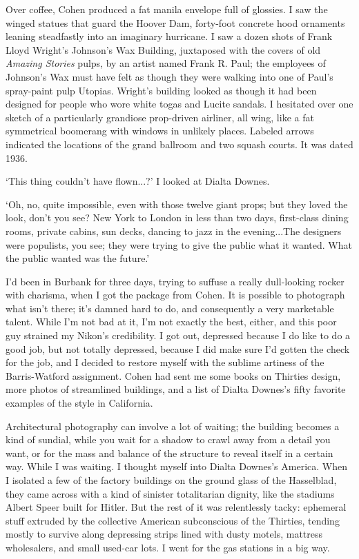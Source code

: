 Over coffee, Cohen produced a fat manila envelope full of glossies. I saw the winged statues that guard the Hoover Dam, forty-foot concrete hood ornaments leaning steadfastly into an imaginary hurricane. I saw a dozen shots of Frank Lloyd Wright's Johnson's Wax Building, juxtaposed with the covers of old \textit{Amazing Stories} pulps, by an artist named Frank R. Paul; the employees of Johnson's Wax must have felt as though they were walking into one of Paul's spray-paint pulp Utopias. Wright's building looked as though it had been designed for people who wore white togas and Lucite sandals. I hesitated over one sketch of a particularly grandiose prop-driven airliner, all wing, like a fat symmetrical boomerang with windows in unlikely places. Labeled arrows indicated the locations of the grand ballroom and two squash courts. It was dated 1936.

`This thing couldn't have flown...?' I looked at Dialta Downes.

`Oh, no, quite impossible, even with those twelve giant props; but they loved the look, don't you see? New York to London in less than two days, first-class dining rooms, private cabins, sun decks, dancing to jazz in the evening...The designers were populists, you see; they were trying to give the public what it wanted. What the public wanted was the future.'

I'd been in Burbank for three days, trying to suffuse a really dull-looking rocker with charisma, when I got the package from Cohen. It is possible to photograph what isn't there; it's damned hard to do, and consequently a very marketable talent. While I'm not bad at it, I'm not exactly the best, either, and this poor guy strained my Nikon's credibility. I got out, depressed because I do like to do a good job, but not totally depressed, because I did make sure I'd gotten the check for the job, and I decided to restore myself with the sublime artiness of the Barris-Watford assignment. Cohen had sent me some books on Thirties design, more photos of streamlined buildings, and a list of Dialta Downes's fifty favorite examples of the style in California.

Architectural photography can involve a lot of waiting; the building becomes a kind of sundial, while you wait for a shadow to crawl away from a detail you want, or for the mass and balance of the structure to reveal itself in a certain way. While I was waiting. I thought myself into Dialta Downes's America. When I isolated a few of the factory buildings on the ground glass of the Hasselblad, they came across with a kind of sinister totalitarian dignity, like the stadiums Albert Speer built for Hitler. But the rest of it was relentlessly tacky: ephemeral stuff extruded by the collective American subconscious of the Thirties, tending mostly to survive along depressing strips lined with dusty motels, mattress wholesalers, and small used-car lots. I went for the gas stations in a big way.

